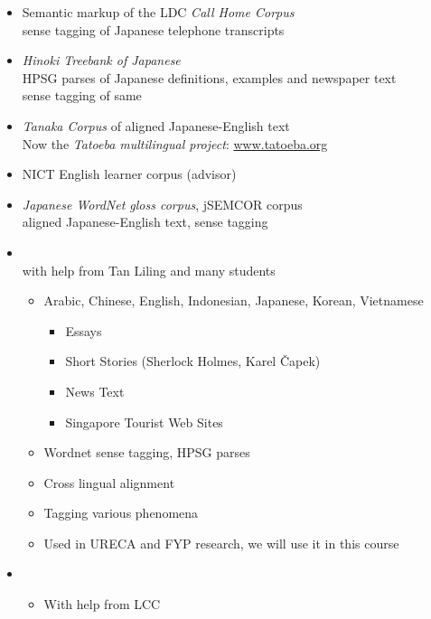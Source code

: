\documentclass[a4paper,landscape,headrule,footrule,xetex]{foils}
\begin{document}
\begin{itemize}
\item Semantic markup of the LDC \textit{Call Home Corpus}
\\ sense tagging of Japanese telephone transcripts
\item \textit{Hinoki Treebank of Japanese}
\\ HPSG parses of Japanese definitions, examples and newspaper text
\\ sense tagging of same
\item \textit{Tanaka Corpus} of aligned Japanese-English text
\\ Now the \textit{Tatoeba multilingual project}: \url{www.tatoeba.org}
\item NICT English learner corpus (advisor)
\item \textit{Japanese WordNet gloss corpus}, jSEMCOR corpus
\\  aligned Japanese-English text, sense tagging
\end{itemize}

\begin{itemize}
\item \textbf{}
\\ with help from Tan Liling and many students
  \begin{itemize}
  \item Arabic, Chinese, English, Indonesian, Japanese, Korean, Vietnamese
    \begin{itemize}
    \item Essays
    \item Short Stories (Sherlock Holmes, Karel Čapek)
    \item News Text
    \item Singapore Tourist Web Sites
    \end{itemize}
  \item Wordnet sense tagging, HPSG parses
  \item Cross lingual alignment
  \item Tagging various phenomena
  \item Used in URECA and FYP research, we will use it in this course
  \end{itemize}
\item {}
  \begin{itemize}
  \item With help from LCC
  \end{itemize}

\end{itemize}
\end{document}
